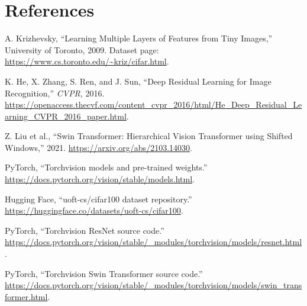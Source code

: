 \documentclass[oneside]{hcmut-report}
\begin{document}
\clearpage
\section*{References}
\begin{enumerate}[leftmargin=7mm,label={[\arabic*]}]
  \item A. Krizhevsky, ``Learning Multiple Layers of Features from Tiny Images,'' University of Toronto, 2009. Dataset page: \url{https://www.cs.toronto.edu/~kriz/cifar.html}.
  \item K. He, X. Zhang, S. Ren, and J. Sun, ``Deep Residual Learning for Image Recognition,'' \textit{CVPR}, 2016. \url{https://openaccess.thecvf.com/content_cvpr_2016/html/He_Deep_Residual_Learning_CVPR_2016_paper.html}.
  \item Z. Liu et al., ``Swin Transformer: Hierarchical Vision Transformer using Shifted Windows,'' 2021. \url{https://arxiv.org/abs/2103.14030}.
  \item PyTorch, ``Torchvision models and pre-trained weights.'' \url{https://docs.pytorch.org/vision/stable/models.html}.
  \item Hugging Face, ``uoft-cs/cifar100 dataset repository.'' \url{https://huggingface.co/datasets/uoft-cs/cifar100}.
  \item PyTorch, ``Torchvision ResNet source code.'' \url{https://docs.pytorch.org/vision/stable/_modules/torchvision/models/resnet.html}.
  \item PyTorch, ``Torchvision Swin Transformer source code.'' \url{https://docs.pytorch.org/vision/stable/_modules/torchvision/models/swin_transformer.html}.
\end{enumerate}
\end{document}
